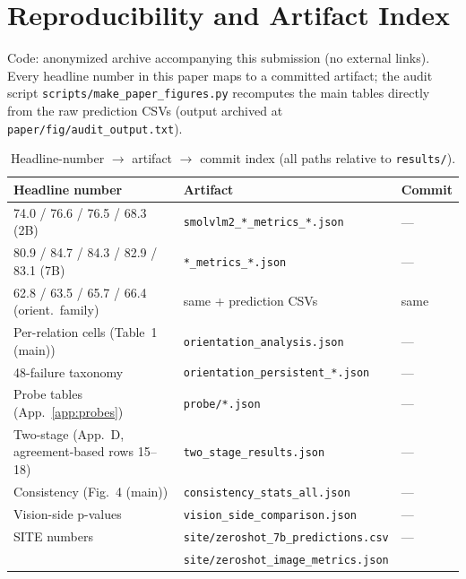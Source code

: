 \section{Reproducibility and Artifact Index}
\label{app:repro}

Code: anonymized archive accompanying this submission (no external links). Every headline number in this
paper maps to a committed artifact; the audit script
\texttt{scripts/make\_paper\_figures.py} recomputes the main tables directly
from the raw prediction CSVs (output archived at
\texttt{paper/fig/audit\_output.txt}).

\begin{table}[h]
\centering
\footnotesize
\setlength{\tabcolsep}{6pt}
\begin{tabular}{lll}
\toprule
Headline number & Artifact & Commit \\
\midrule
74.0 / 76.6 / 76.5 / 68.3 (2B) & \texttt{smolvlm2\_*\_metrics\_*.json} & --- \\
80.9 / 84.7 / 84.3 / 82.9 / 83.1 (7B) & \texttt{*\_metrics\_*.json} & --- \\
62.8 / 63.5 / 65.7 / 66.4 (orient.\ family) & same + prediction CSVs &
same \\
Per-relation cells (Table~1 (main)) & \texttt{orientation\_analysis.json} & --- \\
48-failure taxonomy & \texttt{orientation\_persistent\_*.json} & --- \\
Probe tables (App.~\ref{app:probes}) & \texttt{probe/*.json} & --- \\
Two-stage (App.~D, agreement-based rows 15--18) & \texttt{two\_stage\_results.json} & --- \\
Consistency (Fig.~4 (main)) & \texttt{consistency\_stats\_all.json} & --- \\
Vision-side p-values & \texttt{vision\_side\_comparison.json} & --- \\
SITE numbers & \texttt{site/zeroshot\_7b\_predictions.csv} & --- \\
 & \texttt{site/zeroshot\_image\_metrics.json} & \\
\bottomrule
\end{tabular}
\caption{Headline-number $\rightarrow$ artifact $\rightarrow$ commit index (all
paths relative to \texttt{results/}).}
\label{tab:artifacts}
\end{table}


